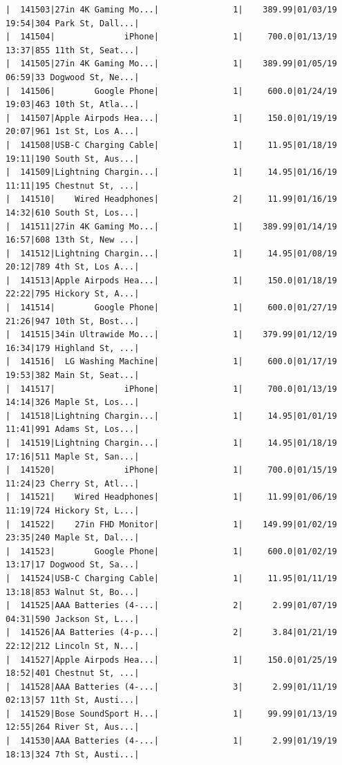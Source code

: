 \documentclass[
  letterpaper,
  DIV=11,
  numbers=noendperiod]{scrartcl}
\begin{document}
\begin{verbatim}
|  141503|27in 4K Gaming Mo...|               1|    389.99|01/03/19 19:54|304 Park St, Dall...|
|  141504|              iPhone|               1|     700.0|01/13/19 13:37|855 11th St, Seat...|
|  141505|27in 4K Gaming Mo...|               1|    389.99|01/05/19 06:59|33 Dogwood St, Ne...|
|  141506|        Google Phone|               1|     600.0|01/24/19 19:03|463 10th St, Atla...|
|  141507|Apple Airpods Hea...|               1|     150.0|01/19/19 20:07|961 1st St, Los A...|
|  141508|USB-C Charging Cable|               1|     11.95|01/18/19 19:11|190 South St, Aus...|
|  141509|Lightning Chargin...|               1|     14.95|01/16/19 11:11|195 Chestnut St, ...|
|  141510|    Wired Headphones|               2|     11.99|01/16/19 14:32|610 South St, Los...|
|  141511|27in 4K Gaming Mo...|               1|    389.99|01/14/19 16:57|608 13th St, New ...|
|  141512|Lightning Chargin...|               1|     14.95|01/08/19 20:12|789 4th St, Los A...|
|  141513|Apple Airpods Hea...|               1|     150.0|01/18/19 22:22|795 Hickory St, A...|
|  141514|        Google Phone|               1|     600.0|01/27/19 21:26|947 10th St, Bost...|
|  141515|34in Ultrawide Mo...|               1|    379.99|01/12/19 16:34|179 Highland St, ...|
|  141516|  LG Washing Machine|               1|     600.0|01/17/19 19:53|382 Main St, Seat...|
|  141517|              iPhone|               1|     700.0|01/13/19 14:14|326 Maple St, Los...|
|  141518|Lightning Chargin...|               1|     14.95|01/01/19 11:41|991 Adams St, Los...|
|  141519|Lightning Chargin...|               1|     14.95|01/18/19 17:16|511 Maple St, San...|
|  141520|              iPhone|               1|     700.0|01/15/19 11:24|23 Cherry St, Atl...|
|  141521|    Wired Headphones|               1|     11.99|01/06/19 11:19|724 Hickory St, L...|
|  141522|    27in FHD Monitor|               1|    149.99|01/02/19 23:35|240 Maple St, Dal...|
|  141523|        Google Phone|               1|     600.0|01/02/19 13:17|17 Dogwood St, Sa...|
|  141524|USB-C Charging Cable|               1|     11.95|01/11/19 13:18|853 Walnut St, Bo...|
|  141525|AAA Batteries (4-...|               2|      2.99|01/07/19 04:31|590 Jackson St, L...|
|  141526|AA Batteries (4-p...|               2|      3.84|01/21/19 22:12|212 Lincoln St, N...|
|  141527|Apple Airpods Hea...|               1|     150.0|01/25/19 18:52|401 Chestnut St, ...|
|  141528|AAA Batteries (4-...|               3|      2.99|01/11/19 02:13|57 11th St, Austi...|
|  141529|Bose SoundSport H...|               1|     99.99|01/13/19 12:55|264 River St, Aus...|
|  141530|AAA Batteries (4-...|               1|      2.99|01/19/19 18:13|324 7th St, Austi...|

\end{verbatim}
\end{document}
